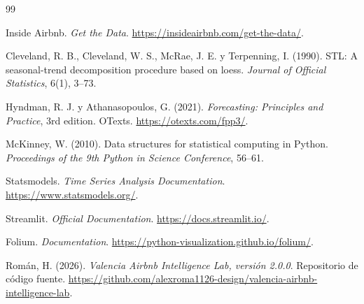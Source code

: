 \documentclass[11pt,a4paper]{article}
\begin{document}
\begin{thebibliography}{99}

Inside Airbnb.
\textit{Get the Data}.
\url{https://insideairbnb.com/get-the-data/}.

Cleveland, R. B., Cleveland, W. S.,
McRae, J. E. y Terpenning, I. (1990).
STL: A seasonal-trend decomposition procedure
based on loess.
\textit{Journal of Official Statistics},
6(1), 3--73.

Hyndman, R. J. y Athanasopoulos, G. (2021).
\textit{Forecasting: Principles and Practice},
3rd edition. OTexts.
\url{https://otexts.com/fpp3/}.

McKinney, W. (2010).
Data structures for statistical computing
in Python.
\textit{Proceedings of the 9th Python in
Science Conference}, 56--61.

Statsmodels.
\textit{Time Series Analysis Documentation}.
\url{https://www.statsmodels.org/}.

Streamlit.
\textit{Official Documentation}.
\url{https://docs.streamlit.io/}.

Folium.
\textit{Documentation}.
\url{https://python-visualization.github.io/folium/}.

Román, H. (2026).
\textit{Valencia Airbnb Intelligence Lab,
versión 2.0.0}.
Repositorio de código fuente.
\url{https://github.com/alexroma1126-design/valencia-airbnb-intelligence-lab}.

\end{thebibliography}
\end{document}
